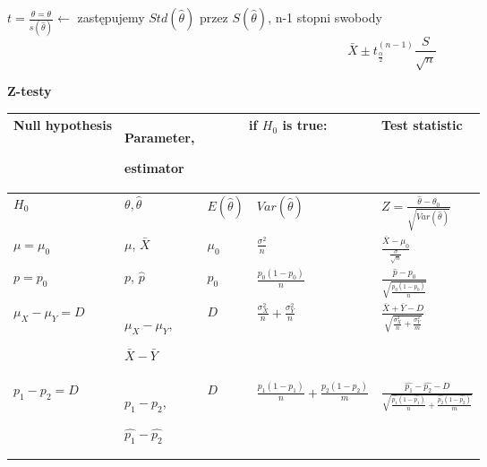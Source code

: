\documentclass[a4paper]{article}
\begin{document}
    $t = \frac{\hat{\theta} = \theta}{s(\hat{\theta})} \leftarrow$ zastępujemy $Std(\hat{\theta})$ przez $S(\hat{\theta})$,
    n-1 stopni swobody
    \begin{equation*}
        \bar{X} \pm t_{\frac{\alpha}{2}}^{(n-1)} \frac{S}{\sqrt{n}}
    \end{equation*}

    \textbf{Z-testy}

    \begin{table}[H]
        \begin{center}
            \begin{tabular}{ p{2.5cm} |p{2.5cm} |p{1.5cm} |p{4cm} |p{4cm}}
                \toprule
                Null hypothesis & Parameter,

                estimator & \multicolumn{2}{c|}{if $H_0$ is true:} & Test statistic\\
                \toprule

                $H_0$ & $\theta, \hat{\theta}$ & $E(\hat{\theta})$ & $Var(\hat{\theta})$ & $Z = \frac{\hat{\theta} - \theta_0}{\sqrt{Var(\hat{\theta})}}$\\

                \cmidrule(r){1-5}

                $\mu = \mu_0$ & $\mu$, $\bar{X}$ & $\mu_0$ & $\frac{\sigma^2}{n}$ & $\frac{\bar{X} - \mu_0}{\frac{\sigma}{\sqrt{n}}}$\\

                \cmidrule(r){1-5}

                $p = p_0$ & $p$, $\hat{p}$ & $p_0$ & $\frac{p_0(1-p_0)}{n}$ & $\frac{\hat{p} - p_0}{\sqrt{\frac{p_0(1-p_0)}{n}}}$\\

                \cmidrule(r){1-5}

                $\mu_X - \mu_Y = D$ &
                $\mu_X - \mu_Y$,

                $\bar{X} - \bar{Y}$
                & $D$ & $\frac{\sigma_X^2}{n} + \frac{\sigma_Y^2}{n}$ & $\frac{\bar{X} + \bar{Y} - D}{\sqrt{\frac{\sigma_X^2}{n} + \frac{\sigma_Y^2}{m}}}$\\

                \cmidrule(r){1-5}

                $p_1 - p_2 = D$ & $p_1 - p_2$,

                $\hat{p_1} - \hat{p_2}$
                & $D$ & $\frac{p_1(1-p_1)}{n} + \frac{p_2(1-p_2)}{m}$ &
                $\frac{\hat{p_1} - \hat{p_2} - D}{\sqrt{\frac{\hat{p_1}(1-\hat{p_1})}{n} + \frac{\hat{p_2}(1-\hat{p_2})}{m}}}$\\


\end{tabular}
\end{center}
\end{table}
\end{document}
